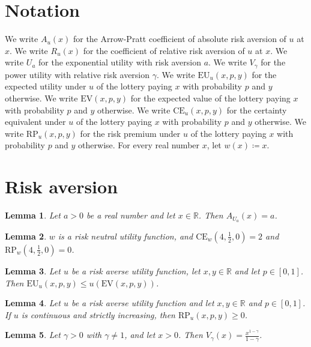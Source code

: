 \documentclass{article}
\newtheorem{lemma}{Lemma}
\begin{document}
\section{Notation}

We write $A_u(x)$ for the Arrow-Pratt coefficient of absolute risk aversion of $u$ at $x$.
We write $R_u(x)$ for the coefficient of relative risk aversion of $u$ at $x$.
We write $U_a$ for the exponential utility with risk aversion $a$.
We write $V_\gamma$ for the power utility with relative risk aversion $\gamma$.
We write $\mathrm{EU}_u(x,p,y)$ for the expected utility under $u$ of the lottery paying $x$ with probability $p$ and $y$ otherwise.
We write $\mathrm{EV}(x,p,y)$ for the expected value of the lottery paying $x$ with probability $p$ and $y$ otherwise.
We write $\mathrm{CE}_u(x,p,y)$ for the certainty equivalent under $u$ of the lottery paying $x$ with probability $p$ and $y$ otherwise.
We write $\mathrm{RP}_u(x,p,y)$ for the risk premium under $u$ of the lottery paying $x$ with probability $p$ and $y$ otherwise.
For every real number $x$, let $w(x)\coloneqq x$.

\section{Risk aversion}

\begin{lemma}\label{cara}
Let $a>0$ be a real number and let $x\in\mathbb{R}$. Then $A_{U_a}(x)=a$.
\end{lemma}

\begin{lemma}\label{neutral}
$w$ is a risk neutral utility function, and $\mathrm{CE}_w(4,\frac12,0)=2$ and $\mathrm{RP}_w(4,\frac12,0)=0$.
\end{lemma}

\begin{lemma}\label{averse}
Let $u$ be a risk averse utility function, let $x,y\in\mathbb{R}$ and let $p\in[0,1]$. Then $\mathrm{EU}_u(x,p,y)\le u(\mathrm{EV}(x,p,y))$.
\end{lemma}

\begin{lemma}\label{premium}
Let $u$ be a risk averse utility function and let $x,y\in\mathbb{R}$ and $p\in[0,1]$. If $u$ is continuous and strictly increasing, then $\mathrm{RP}_u(x,p,y)\ge0$.
\end{lemma}

\begin{lemma}\label{crra}
Let $\gamma>0$ with $\gamma\ne1$, and let $x>0$. Then $V_\gamma(x)=\frac{x^{1-\gamma}}{1-\gamma}$.
\end{lemma}
\end{document}
